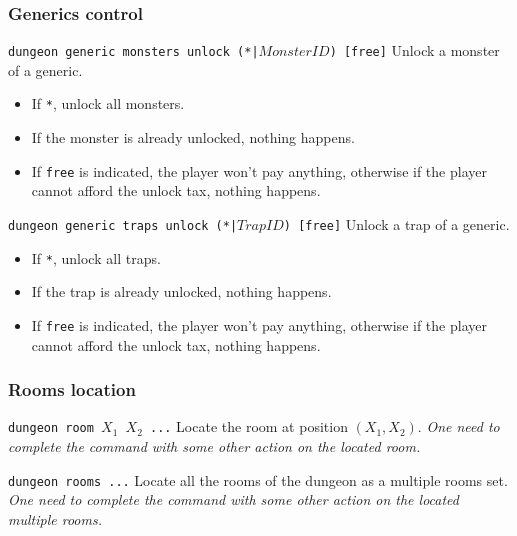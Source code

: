 \documentclass[10pt,a4paper]{scrartcl}
\newenvironment{apiCode}[1]
{ \begin{lrbox}{\mybox} \begin{minipage}{0.9\textwidth} {\color{Mahogany} \small\texttt{#1}} \vspace{8pt} \newline }
{ \end{minipage} \end{lrbox}\fbox{\usebox{\mybox}} \newline\vspace{4pt}\newline }
\begin{document}
\subsubsection{Generics control}
\begin{apiCode}{dungeon generic monsters unlock (*|$MonsterID$) [free]}
Unlock a monster of a generic.
\begin{itemize}
\itemsep 0em
\item If \verb#*#, unlock all monsters.
\item If the monster is already unlocked, nothing happens.
\item If \verb#free# is indicated, the player won't pay anything,\newline
	  otherwise if the player cannot afford the unlock tax, nothing happens.
\end{itemize}
\end{apiCode}
\begin{apiCode}{dungeon generic traps unlock (*|$TrapID$) [free]}
Unlock a trap of a generic.
\begin{itemize}
\itemsep 0em
\item If \verb#*#, unlock all traps.
\item If the trap is already unlocked, nothing happens.
\item If \verb#free# is indicated, the player won't pay anything,\newline
	  otherwise if the player cannot afford the unlock tax, nothing happens.
\end{itemize}
\end{apiCode}

\subsubsection{Rooms location}
\begin{apiCode}{dungeon room $X_1$ $X_2$ ...}
Locate the room at position $(X_1, X_2)$.\newline
\textit{One need to complete the command with some other action on the located room.}
\end{apiCode}
\begin{apiCode}{dungeon rooms ...}
Locate all the rooms of the dungeon as a multiple rooms set.\newline
\textit{One need to complete the command with some other action on the located multiple rooms.}
\end{apiCode}
\end{document}
